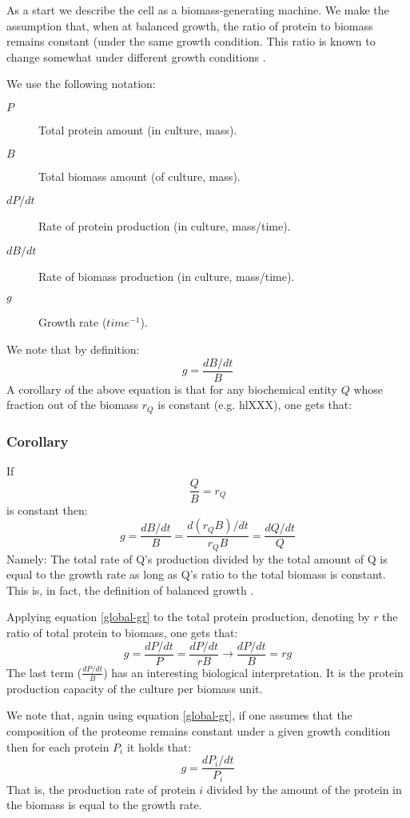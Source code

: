 \documentclass{report}
\begin{document}
As a start we describe the cell as a biomass-generating machine.
We make the assumption that, when at balanced growth, the ratio of protein to biomass remains constant (under the same growth condition.
This ratio is known to change somewhat under different growth conditions \cite{Bremer1987}.

We use the following notation:
\begin{description}
\item[$P$] Total protein amount (in culture, mass).
\item[$B$] Total biomass amount (of culture, mass).
\item [$dP/dt$] Rate of protein production (in culture, mass/time).
\item [$dB/dt$] Rate of biomass production (in culture, mass/time).
\item [$g$] Growth rate ($time^{-1}$).
\end{description}
We note that by definition:
\[ g=\frac{dB/dt}{B}\]
A corollary of the above equation is that for any biochemical entity $Q$ whose fraction out of the biomass $r_Q$ is constant (e.g. hl{XXX}), one gets that:
\subsubsection{Corollary}
If
\[\frac{Q}{B}=r_Q\]
is constant then:
\begin{equation}
\label{global-gr}
g=\frac{dB/dt}{B}=\frac{d(r_QB)/dt}{r_QB}=\frac{dQ/dt}{Q}
\end{equation}
Namely: The total rate of Q’s production divided by the total amount of Q is equal to the growth rate as long as Q’s ratio to the total biomass is constant.
This is, in fact, the definition of balanced growth \cite{Campbell1957}.

Applying equation \ref{global-gr} to the total protein production, denoting by $r$ the ratio of total protein to biomass, one gets that:
\[g=\frac{dP/dt}{P}=\frac{dP/dt}{rB}\rightarrow\frac{dP/dt}{B}=rg\]
The last term ($\frac{dP/dt}{B}$) has an interesting biological interpretation.
It is the protein production capacity of the culture per biomass unit.

We note that, again using equation \ref{global-gr}, if one assumes that the composition of the proteome remains constant under a given growth condition then for each protein $P_i$ it holds that:
\[g=\frac{dP_i/dt}{P_i}\]
That is, the production rate of protein $i$ divided by the amount of the protein in the biomass is equal to the growth rate.
\end{document}
